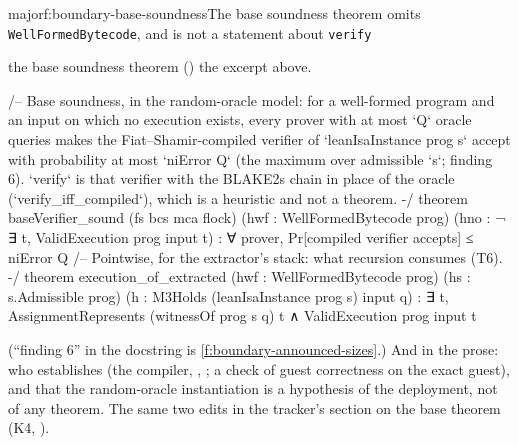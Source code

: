 \begin{finding}{major}{f:boundary-base-soundness}{The base soundness theorem omits \texttt{WellFormedBytecode}, and is not a statement about \texttt{verify}}
\begin{change}{the base soundness theorem ()}
\asis the excerpt above.
\asproposed
\begin{leancode}
/-- Base soundness, in the random-oracle model: for a well-formed program and an input on
which no execution exists, every prover with at most `Q` oracle queries makes the
Fiat–Shamir-compiled verifier of `leanIsaInstance prog s` accept with probability at most
`niError Q` (the maximum over admissible `s`; finding 6). `verify` is that verifier with the
BLAKE2s chain in place of the oracle (`verify_iff_compiled`), which is a heuristic and not a
theorem. -/
theorem baseVerifier_sound (fs bcs mca flock) (hwf : WellFormedBytecode prog)
    (hno : ¬ ∃ t, ValidExecution prog input t) : ∀ prover, Pr[compiled verifier accepts] ≤ niError Q
/-- Pointwise, for the extractor's stack: what recursion consumes (T6). -/
theorem execution_of_extracted (hwf : WellFormedBytecode prog) (hs : s.Admissible prog)
    (h : M3Holds (leanIsaInstance prog s) input q) :
    ∃ t, AssignmentRepresents (witnessOf prog s q) t ∧ ValidExecution prog input t
\end{leancode}
(\enquote{finding 6} in the docstring is \cref{f:boundary-announced-sizes}.) And in the prose: who
establishes  (the compiler, ,
; a check of guest correctness on the exact guest), and that the random-oracle
instantiation is a hypothesis of the deployment, not of any theorem. The same two edits in the
tracker's section on the base theorem (K4, ).
\end{change}
\end{finding}

